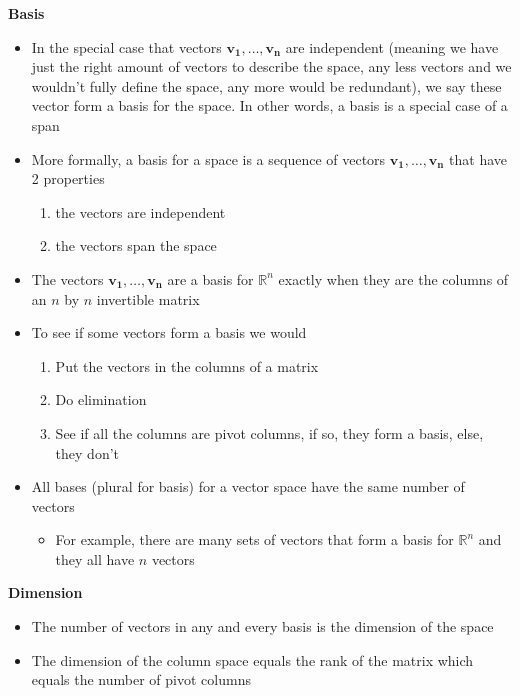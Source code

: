 \documentclass[11pt]{article}
\begin{document}
\textbf{Basis}
\begin{itemize}    
    \item In the special case that vectors $\boldsymbol{v_1}, \ldots, \boldsymbol{v_n}$ are
    independent (meaning we have just the right amount of vectors to describe the space, any 
    less vectors and we wouldn't fully define the space, any more would be redundant), we say
    these vector form a basis for the space. In other words, a basis is a special case of a 
    span
    \item More formally, a basis for a space is a sequence of vectors $\boldsymbol{v_1}, \ldots
    , \boldsymbol{v_n}$ that have 2 properties
    \begin{enumerate}
        \item the vectors are independent
        \item the vectors span the space
    \end{enumerate}
    \item The vectors $\boldsymbol{v_1}, \ldots, \boldsymbol{v_n}$ are a basis for $\mathbb{R}^n$
    exactly when they are the columns of an $n$ by $n$ invertible matrix
    \item To see if some vectors form a basis we would 
    \begin{enumerate}
        \item Put the vectors in the columns of a matrix
        \item Do elimination
        \item See if all the columns are pivot columns, if so, they form a basis, else, they 
        don't
    \end{enumerate}
    \item All bases (plural for basis) for a vector space have the same number of vectors
    \begin{itemize}
        \item For example, there are many sets of vectors that form a basis for $\mathbb{R}^n$ 
        and they all have $n$ vectors
    \end{itemize}
    
\end{itemize}

\textbf{Dimension}
\begin{itemize}
    \item The number of vectors in any and every basis is the dimension of the space
    \item The dimension of the column space equals the rank of the matrix which equals the
    number of pivot columns
\end{itemize}
\end{document}
